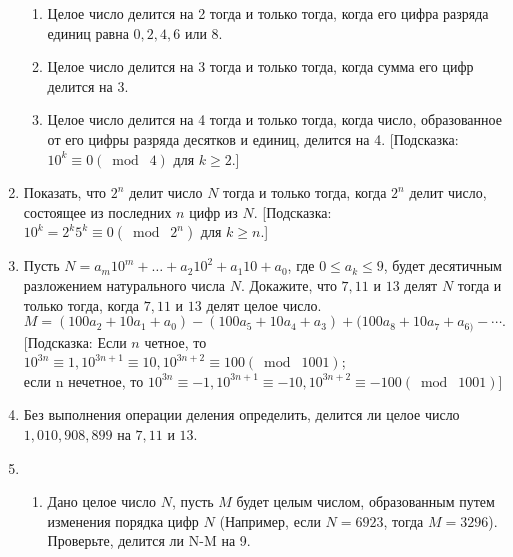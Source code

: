 \documentclass[11pt]{article}
\begin{document}
\begin{enumerate}
\begin{enumerate}
\item Целое число делится на 2 тогда и только тогда, когда его цифра разряда единиц равна $ 0,2,4,6 $ или $8$.
\item Целое число делится на 3 тогда и только тогда, когда сумма его цифр делится на 3.
\item Целое число делится на 4 тогда и только тогда, когда число, образованное от его цифры разряда десятков и единиц, делится на 4. [Подсказка: $10^{k}\equiv0(\bmod\; 4)$ для $ k\geq2 $.]
\end{enumerate}
\item Показать, что $ 2^{n} $ делит число $N$ тогда и только тогда, когда  $ 2^{n} $ делит число, состоящее из последних $n$ цифр из $N$. [Подсказка: $10^{k}=2^{k}5^{k}\equiv0(\bmod\; 2^{n}) $ для $ k\geq n $.]
\item Пусть $ N=a_{m}10^{m}+\ldots+a_{2}10^{2}+a_{1}10+a_{0} $, где $ 0\leq a_{k}\leq9 $, будет десятичным разложением натурального числа $N$. Докажите, что $7,11$ и $13$ делят $N$ тогда и только тогда, когда $7,11$ и $13$ делят целое число. $$M=(100a_{2}+10a_{1}+a_{0})-(100a_{5}+10a_{4}+a_{3})+(100a_{8}+10a_{7}+a_{6)}-\cdots.  $$ [Подсказка: Если $n$ четное, то $ 10^{3n}\equiv1, 10^{3n+1}\equiv10,10^{3n+2}\equiv100(\bmod\; 1001) $;\\ если n нечетное, то $ 10^{3n}\equiv-1, 10^{3n+1}\equiv-10,10^{3n+2}\equiv-100(\bmod\; 1001)  $]
\item Без выполнения операции деления определить, делится ли целое число $1,010,908,899 $ на $ 7,11 $ и $13$.
\item 
\begin{enumerate}
\item Дано целое число $N$, пусть $M$ будет целым числом, образованным путем изменения порядка цифр $N$ (Например, если $N=6923$, тогда $M=3296$).\\ Проверьте, делится ли N-M на 9.
\end{enumerate}
\end{enumerate}
\end{document}
